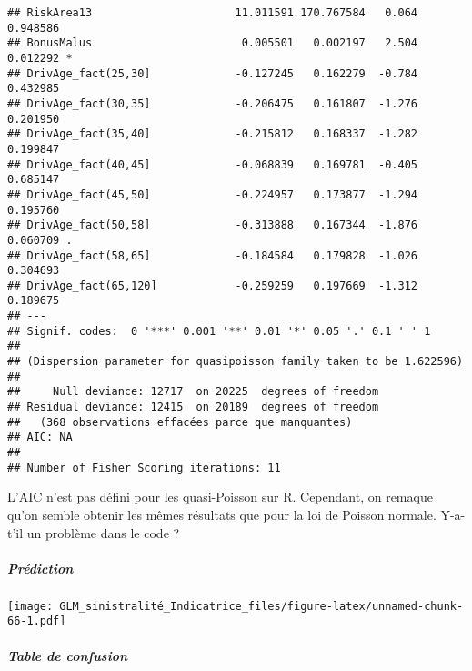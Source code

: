 \documentclass[
]{article}
\newenvironment{Shaded}{\begin{snugshade}}{\end{snugshade}}
\newcommand{\FunctionTok}[1]{\textcolor[rgb]{0.00,0.00,0.00}{#1}}
\newcommand{\NormalTok}[1]{#1}
\newcommand{\OtherTok}[1]{\textcolor[rgb]{0.56,0.35,0.01}{#1}}
\newcommand{\SpecialCharTok}[1]{\textcolor[rgb]{0.00,0.00,0.00}{#1}}
\begin{document}
\begin{verbatim}
## RiskArea13                      11.011591 170.767584   0.064 0.948586    
## BonusMalus                       0.005501   0.002197   2.504 0.012292 *  
## DrivAge_fact(25,30]             -0.127245   0.162279  -0.784 0.432985    
## DrivAge_fact(30,35]             -0.206475   0.161807  -1.276 0.201950    
## DrivAge_fact(35,40]             -0.215812   0.168337  -1.282 0.199847    
## DrivAge_fact(40,45]             -0.068839   0.169781  -0.405 0.685147    
## DrivAge_fact(45,50]             -0.224957   0.173877  -1.294 0.195760    
## DrivAge_fact(50,58]             -0.313888   0.167344  -1.876 0.060709 .  
## DrivAge_fact(58,65]             -0.184584   0.179828  -1.026 0.304693    
## DrivAge_fact(65,120]            -0.259259   0.197669  -1.312 0.189675    
## ---
## Signif. codes:  0 '***' 0.001 '**' 0.01 '*' 0.05 '.' 0.1 ' ' 1
## 
## (Dispersion parameter for quasipoisson family taken to be 1.622596)
## 
##     Null deviance: 12717  on 20225  degrees of freedom
## Residual deviance: 12415  on 20189  degrees of freedom
##   (368 observations effacées parce que manquantes)
## AIC: NA
## 
## Number of Fisher Scoring iterations: 11
\end{verbatim}

L'AIC n'est pas défini pour les quasi-Poisson sur R. Cependant, on
remaque qu'on semble obtenir les mêmes résultats que pour la loi de
Poisson normale. Y-a-t'il un problème dans le code ?

\hypertarget{pruxe9diction}{%
\subparagraph{Prédiction}\label{pruxe9diction}}

\begin{Shaded}
\end{Shaded}

\texttt{[image: GLM\_sinistralité\_Indicatrice\_files/figure-latex/unnamed-chunk-66-1.pdf]}

\hypertarget{table-de-confusion-1}{%
\subparagraph{Table de confusion}\label{table-de-confusion-1}}

\begin{Shaded}
\end{Shaded}
\end{document}
